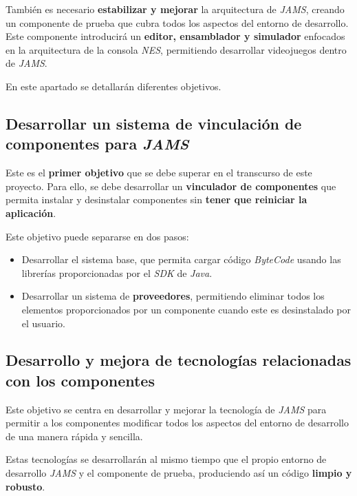  También es necesario \textbf{estabilizar y mejorar}
la arquitectura de \textit{JAMS}, creando un componente
de prueba que cubra todos los aspectos del entorno de desarrollo.
Este componente introducirá un \textbf{editor, ensamblador y simulador}
enfocados en la arquitectura de la consola \textit{NES}, permitiendo
desarrollar videojuegos dentro de \textit{JAMS}.

 En este apartado se detallarán diferentes objetivos.

\subsection{Desarrollar un sistema de vinculación de componentes para \textit{JAMS}}
\label{subsec:desarrollar-un-sistema-de-vinculacion-de-componentes-para-jams}

Este es el \textbf{primer objetivo} que se debe superar en el transcurso de este
proyecto.
Para ello, se debe desarrollar un \textbf{vinculador de componentes} que permita
instalar y desinstalar componentes sin \textbf{tener que reiniciar la aplicación}.

\noexpand Este objetivo puede separarse en dos pasos:
\begin{itemize}
    \item Desarrollar el sistema base, que permita cargar código \textit{ByteCode}
    usando las librerías proporcionadas por el \textit{SDK} de \textit{Java}.
    \item Desarrollar un sistema de \textbf{proveedores}, permitiendo
    eliminar todos los elementos proporcionados por un componente
    cuando este es desinstalado por el usuario.
\end{itemize}

\subsection{Desarrollo y mejora de tecnologías relacionadas con los componentes}
\label{subsec:desarrollo-y-mejora-de-tecnologias-relacionadas-con-los-componentes}

Este objetivo se centra en desarrollar y mejorar la tecnología de \textit{JAMS}
para permitir a los componentes modificar todos los aspectos del entorno de
desarrollo de una manera rápida y sencilla.

 Estas tecnologías se desarrollarán al mismo tiempo que el propio entorno
de desarrollo \textit{JAMS} y el componente de prueba, produciendo así
un código \textbf{limpio y robusto}.

